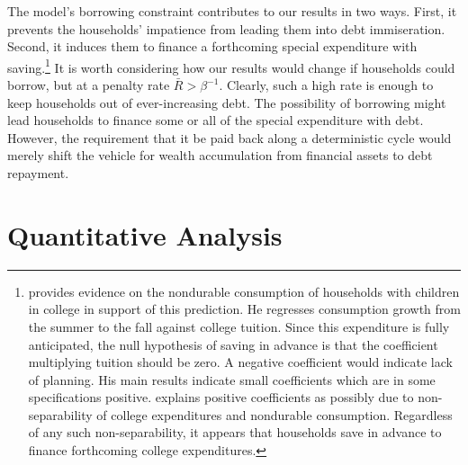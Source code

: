 \documentclass[fleqccn,12pt]{article}
\begin{document}
The model's borrowing constraint contributes to our results in two ways. First, it prevents the households' impatience from leading them into debt immiseration. Second, it induces them to finance a forthcoming special expenditure with saving.\footnote{\cite{jpub2000Souleles} provides evidence on the nondurable consumption of households with children in college in support of this prediction. He regresses consumption growth from the summer to the fall against college tuition. Since this expenditure is fully anticipated, the null hypothesis of saving in advance is that the coefficient multiplying tuition should be zero. A negative coefficient would indicate lack of planning. His main results indicate small coefficients which are in some specifications positive. \citeauthor{jpub2000Souleles} explains positive coefficients as possibly due to non-separability of college expenditures and nondurable consumption. Regardless of any such non-separability, it appears that households save in advance to finance forthcoming college expenditures.}
It is worth considering how our results would change if households could borrow, but at a penalty rate $\bar{R}>\beta^{-1}$. Clearly, such a high rate is enough to keep households out of ever-increasing debt. The possibility of borrowing might lead households to finance some or all of the special expenditure with debt. However, the requirement that it be paid back along a deterministic cycle would merely shift the vehicle for wealth accumulation from financial assets to debt repayment. 

\section{Quantitative Analysis\label{quantitative}}
\end{document}
